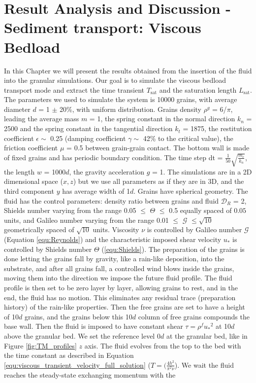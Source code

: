 
\chapter{Result Analysis and Discussion - Sediment transport: Viscous Bedload}
\label{chap:Resultados-CFD}

    In this Chapter we will present the results obtained from the insertion of the fluid into the granular simulations. Our goal is to simulate the viscous bedload transport mode and extract the time transient $T_\textrm{sat}$ and the saturation length $L_\textrm{sat}$. The parameters we used to simulate the system is 10000 grains, with average diameter $d$ = 1 $\pm$ 20\%, with uniform distribution. Grains density $\rho^{g}$ = 6/$\pi$, leading the average mass $m$ = 1, the spring constant in the normal direction $k_{n}$ = 2500 and the spring constant in the tangential direction $k_{t}$ = 1875, the restitution coefficient $\epsilon \sim$ 0.25 (damping coefficient $\gamma \sim$ 42\% to the critical value), the friction coefficient $\mu$ = 0.5 between grain-grain contact. The bottom wall is made of fixed grains and has periodic boundary condition. The time step dt = $\frac{1}{50}\sqrt{\frac{m_r}{k_n}}$, the length $w$ = 1000$d$, the gravity acceleration $g$ = 1. The simulations are in a 2D dimensional space ($x,z$) but we use all parameters as if they are in 3D, and the third component $y$ has average width of 1$d$. Grains have spherical geometry. The fluid has the control parameters: density ratio between grains and fluid $\mathcal{D}_{R}$ = 2, Shields number varying from the range 0.05 $\leq$ $\Theta$ $\leq$ 0.5 equally spaced of $0.05$ units, and Galileo number varying from the range 0.01 $\leq$ $\mathcal{G}$ $\leq \sqrt{10}$ geometrically spaced of $\sqrt{10}$ units. Viscosity $\nu$ is controlled by Galileo number $\mathcal{G}$ (Equation \ref{equ:Reynolds}) and the characteristic imposed shear velocity $u_{*}$ is controlled by Shields number $\Theta$ (\ref{equ:Shields}). The preparation of the grains is done letting the grains fall by gravity, like a rain-like deposition, into the substrate, and after all grains fall, a controlled wind blows inside the grains, moving them into the direction we impose the future fluid profile. The fluid profile is then set to be zero layer by layer, allowing grains to rest, and in the end, the fluid has no motion. This eliminates any residual trace (preparation history) of the rain-like properties. Then the free grains are set to have a height of 10$d$ grains, and the grains below this 10$d$ column of free grains compounds the base wall. Then the fluid is imposed to have constant shear $\tau = \rho^f {u_{*}}^2$ at 10$d$ above the granular bed. We set the reference level 0$d$ at the granular bed, like in Figure \ref{fig:TM_profiles} $z$ axis. The fluid evolves from the top to the bed with the time constant as described in Equation \ref{equ:viscous_transient_velocity_full_solution} ($T = (\frac{4h^2}{\pi^2 \nu}$). We wait the fluid reaches the steady-state exchanging momentum with the 
